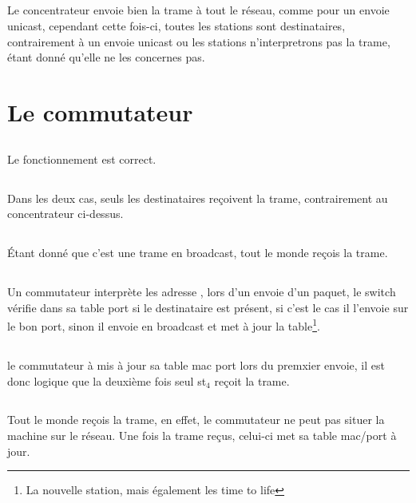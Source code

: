 \documentclass[a4paper, 11pt]{article}
\newcommand{\mac}{\bsc{mac}}
\begin{document}
		\subsection{}
		Le concentrateur envoie bien la trame à tout le réseau, comme pour un envoie unicast,
		cependant cette fois-ci, toutes les stations sont destinataires, contrairement à un
		envoie unicast ou les stations n'interpretrons pas la trame, étant donné qu'elle ne
		les concernes pas.
	\section{Le commutateur}
	\subsection{}
		Le fonctionnement est correct.
	\subsection{}
	Dans les deux cas, seuls les destinataires reçoivent la trame, contrairement au
	concentrateur ci-dessus.
	\subsection{}
	\'Etant donné que c'est une trame en broadcast, tout le monde reçois la trame.

	\subsection{}
	Un commutateur interprète les adresse \mac, lors d'un envoie d'un paquet, le switch
	vérifie dans sa table \mac port si le destinataire est présent, si c'est le cas il
	l'envoie sur le bon port, sinon il envoie en broadcast et met à jour la table\footnote{La
	nouvelle station, mais également les time to life}.
	\subsection{}
	le commutateur à mis à jour sa table mac port lors du premxier envoie, il est donc
	logique que la deuxième fois seul st$_4$ reçoit la trame.
	\subsection{}
	Tout le monde reçois la trame, en effet, le commutateur ne peut pas situer la machine sur
	le réseau. Une fois la trame reçus, celui-ci met sa table mac/port à jour.
\end{document}
